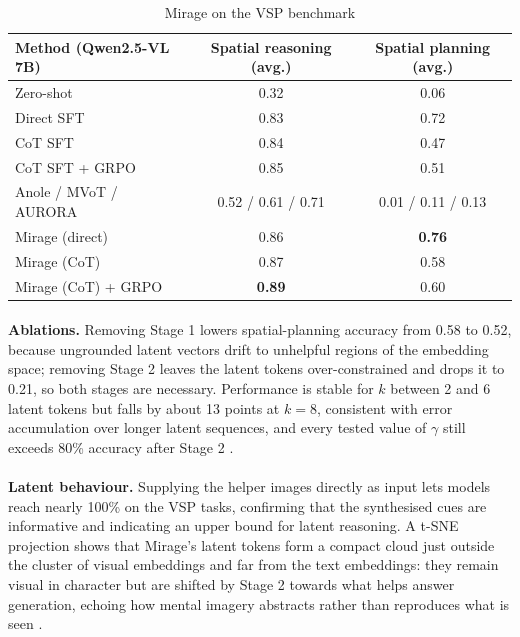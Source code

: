 \documentclass[12pt,a4paper,final]{extreport}
\begin{document}
{\renewcommand{\arraystretch}{1.12}
\begin{table}[htbp]
\centering
\caption{Mirage on the VSP benchmark}\label{tab:p1_vsp}
\small
\begin{tabular}{|l|c|c|}
\hline
\textbf{Method (Qwen2.5-VL 7B)} & \textbf{Spatial reasoning (avg.)} & \textbf{Spatial planning (avg.)} \\ \hline
Zero-shot & 0.32 & 0.06 \\ \hline
Direct SFT & 0.83 & 0.72 \\ \hline
CoT SFT & 0.84 & 0.47 \\ \hline
CoT SFT + GRPO & 0.85 & 0.51 \\ \hline
Anole / MVoT / AURORA & 0.52 / 0.61 / 0.71 & 0.01 / 0.11 / 0.13 \\ \hline
Mirage (direct) & 0.86 & \textbf{0.76} \\ \hline
Mirage (CoT) & 0.87 & 0.58 \\ \hline
Mirage (CoT) + GRPO & \textbf{0.89} & 0.60 \\ \hline
\end{tabular}
\end{table}}

\paragraph{} \textbf{Ablations.} Removing Stage 1 lowers spatial-planning accuracy from 0.58 to 0.52, because ungrounded latent vectors drift to unhelpful regions of the embedding space; removing Stage 2 leaves the latent tokens over-constrained and drops it to 0.21, so both stages are necessary. Performance is stable for $k$ between 2 and 6 latent tokens but falls by about 13 points at $k=8$, consistent with error accumulation over longer latent sequences, and every tested value of $\gamma$ still exceeds 80\% accuracy after Stage 2 \cite{p1}.

\paragraph{} \textbf{Latent behaviour.} Supplying the helper images directly as input lets models reach nearly 100\% on the VSP tasks, confirming that the synthesised cues are informative and indicating an upper bound for latent reasoning. A t-SNE projection shows that Mirage's latent tokens form a compact cloud just outside the cluster of visual embeddings and far from the text embeddings: they remain visual in character but are shifted by Stage 2 towards what helps answer generation, echoing how mental imagery abstracts rather than reproduces what is seen \cite{p1}.
\end{document}
